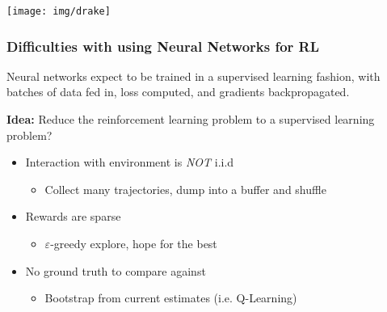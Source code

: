 \documentclass[10pt,a4paper]{beamer}
\begin{document}
\begin{frame}
	\centering
		\texttt{[image: img/drake]}
\end{frame}

\begin{frame}
	\frametitle{Difficulties with using Neural Networks for RL}
	
	
		Neural networks expect to be trained in a supervised learning fashion,
		with batches of data fed in, loss computed, and gradients backpropagated.  
	
	
	\textbf{Idea:} Reduce the reinforcement learning problem
	to a supervised learning problem?
		
		\begin{itemize}
		\item Interaction with environment is \textit{NOT} i.i.d
		\begin{itemize}
			\pause
			\item Collect many trajectories, dump into a buffer and shuffle
		\end{itemize}
		\pause
		\item Rewards are sparse
		\begin{itemize}
			\pause
			\item $\varepsilon$-greedy explore, hope for the best
		\end{itemize}
		\pause
		\item No ground truth to compare against
		\begin{itemize}
			\pause
			\item Bootstrap from current estimates (i.e. Q-Learning)
		\end{itemize}
	\end{itemize}
\end{frame}
\end{document}
